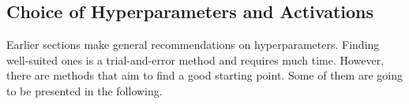 \subsection{Choice of Hyperparameters and Activations}
\label{sec:neural-networks-improving-performance}
Earlier sections make general recommendations on hyperparameters.
Finding well-suited ones is a trial-and-error method and requires much time.
However, there are methods that aim to find a good starting point.
Some of them are going to be presented in the following.




